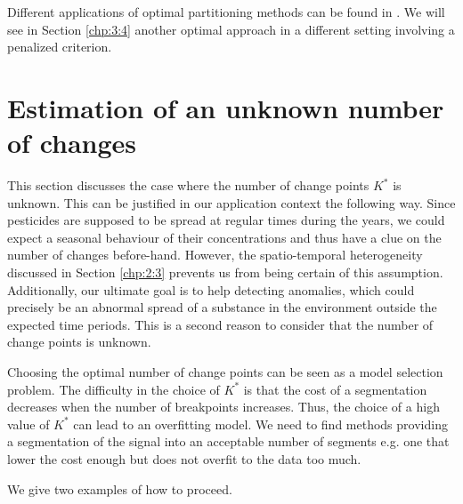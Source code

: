 Different applications of optimal partitioning methods can be found in \cite{rigaill2015pruned,Lavielle1997,perron2006dealing}. We will see in Section \ref{chp:3:4} another optimal approach in a different setting involving a penalized criterion.     


\section{Estimation of an unknown number of changes}\label{chp:3:3}

This section discusses the case where the number of change points $K^*$ is unknown. This can be justified in our application context the following way. Since pesticides are supposed to be spread at regular times during the years, we could expect a seasonal behaviour of their concentrations and thus have a clue on the number of changes before-hand. However, the spatio-temporal heterogeneity discussed in Section \ref{chp:2:3} prevents us from being certain of this assumption. Additionally, our ultimate goal is to help detecting anomalies, which could precisely be an abnormal spread of a substance in the environment outside the expected time periods. This is a second reason to consider that the number of change points is unknown.

Choosing the optimal number of change points can be seen as a model selection problem. The difficulty in the choice of $K^*$ is that the cost of a segmentation decreases when the number of breakpoints increases. Thus, the choice of a high value of $K^*$ can lead to an overfitting model. We need to find methods providing a segmentation of the signal into an acceptable number of segments e.g. one that lower the cost enough but does not overfit to the data too much. 

We give two examples of how to proceed.

